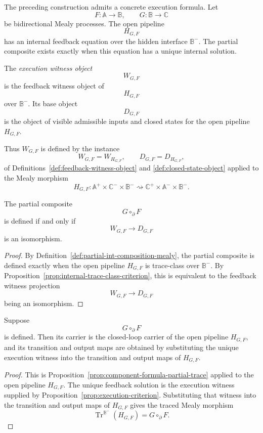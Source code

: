 The preceding construction admits a concrete execution formula.  Let
\[
F:\mathbb A\to\mathbb B,
\qquad
G:\mathbb B\to\mathbb C
\]
be bidirectional Mealy processes.  The open pipeline
\[
H_{G,F}
\]
has an internal feedback equation over the hidden interface \(\mathbb B^-\).
The partial composite exists exactly when this equation has a unique internal
solution.

\begin{definition}
\label{def:execution-witness}
The \emph{execution witness object}
\[
W_{G,F}
\]
is the feedback witness object of
\[
H_{G,F}
\]
over \(\mathbb B^-\).  Its base object
\[
D_{G,F}
\]
is the object of visible admissible inputs and closed states for the open
pipeline \(H_{G,F}\).
\end{definition}

Thus \(W_{G,F}\) is defined by the instance
\[
W_{G,F}
=
W_{H_{G,F}},
\qquad
D_{G,F}
=
D_{H_{G,F}},
\]
of Definitions~\ref{def:feedback-witness-object} and
\ref{def:closed-state-object} applied to the Mealy morphism
\[
H_{G,F}:
\mathbb A^+\times\mathbb C^-\times\mathbb B^-
\rightsquigarrow
\mathbb C^+\times\mathbb A^-\times\mathbb B^-.
\]

\begin{proposition}
\label{prop:execution-criterion}
The partial composite
\[
G\circ_{\partial}F
\]
is defined if and only if
\[
W_{G,F}\to D_{G,F}
\]
is an isomorphism.
\end{proposition}

\begin{proof}
By Definition~\ref{def:partial-int-composition-mealy}, the partial composite
is defined exactly when the open pipeline \(H_{G,F}\) is trace-class over
\(\mathbb B^-\).  By
Proposition~\ref{prop:internal-trace-class-criterion}, this is equivalent to
the feedback witness projection
\[
W_{G,F}\to D_{G,F}
\]
being an isomorphism.
\end{proof}

\begin{theorem}
\label{thm:mealy-execution-formula}
Suppose
\[
G\circ_{\partial}F
\]
is defined.  Then its carrier is the closed-loop carrier of the open pipeline
\(H_{G,F}\), and its transition and output maps are obtained by substituting
the unique execution witness into the transition and output maps of
\(H_{G,F}\).
\end{theorem}

\begin{proof}
This is Proposition~\ref{prop:component-formula-partial-trace} applied to the
open pipeline \(H_{G,F}\).  The unique feedback solution is the execution
witness supplied by Proposition~\ref{prop:execution-criterion}.  Substituting
that witness into the transition and output maps of \(H_{G,F}\) gives the
traced Mealy morphism
\[
\operatorname{Tr}^{\mathbb B^-}(H_{G,F})
=
G\circ_{\partial}F.
\]
\end{proof}

